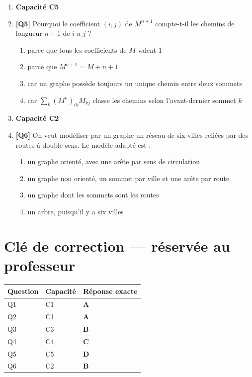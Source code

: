 \begin{enumerate}
\item[] \textbf{Capacité C5}

\item \textbf{[Q5]} Pourquoi le coefficient $(i,j)$ de $M^{n+1}$ compte-t-il les chemins de longueur $n+1$ de $i$ a $j$ ?
  \begin{enumerate}[label=\Alph*.]
    \item parce que tous les coefficients de $M$ valent 1
    \item parce que $M^{n+1}=M+n+1$
    \item car un graphe possède toujours un unique chemin entre deux sommets
    \item car $\sum_k(M^n)_{ik}M_{kj}$ classe les chemins selon l'avant-dernier sommet $k$
  \end{enumerate}

\item[] \textbf{Capacité C2}

\item \textbf{[Q6]} On veut modéliser par un graphe un réseau de six villes reliées par des routes à double sens. Le modèle adapté est :
  \begin{enumerate}[label=\Alph*.]
    \item un graphe orienté, avec une arête par sens de circulation
    \item un graphe non orienté, un sommet par ville et une arête par route
    \item un graphe dont les sommets sont les routes
    \item un arbre, puisqu'il y a six villes
  \end{enumerate}

\end{enumerate}

\ifnxVersionProfesseur
\clearpage
\section*{Clé de correction — réservée au professeur}

\begin{center}
\begin{tabular}{lll}
\hline
Question & Capacité & Réponse exacte \\
\hline
Q1 & C1 & \textbf{A} \\
Q2 & C1 & \textbf{A} \\
Q3 & C3 & \textbf{B} \\
Q4 & C4 & \textbf{C} \\
Q5 & C5 & \textbf{D} \\
Q6 & C2 & \textbf{B} \\
\hline
\end{tabular}
\end{center}

